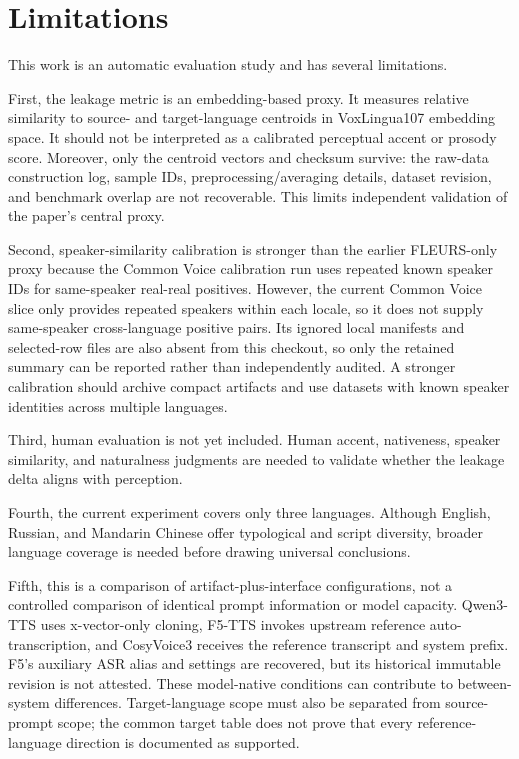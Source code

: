 \documentclass[11pt]{article}
\begin{document}
\FloatBarrier

\section{Limitations}

This work is an automatic evaluation study and has several limitations.

First, the leakage metric is an embedding-based proxy. It measures relative similarity to source- and target-language centroids in VoxLingua107 embedding space. It should not be interpreted as a calibrated perceptual accent or prosody score. Moreover, only the centroid vectors and checksum survive: the raw-data construction log, sample IDs, preprocessing/averaging details, dataset revision, and benchmark overlap are not recoverable. This limits independent validation of the paper's central proxy.

Second, speaker-similarity calibration is stronger than the earlier FLEURS-only proxy because the Common Voice calibration run uses repeated known speaker IDs for same-speaker real-real positives. However, the current Common Voice slice only provides repeated speakers within each locale, so it does not supply same-speaker cross-language positive pairs. Its ignored local manifests and selected-row files are also absent from this checkout, so only the retained summary can be reported rather than independently audited. A stronger calibration should archive compact artifacts and use datasets with known speaker identities across multiple languages.

Third, human evaluation is not yet included. Human accent, nativeness, speaker similarity, and naturalness judgments are needed to validate whether the leakage delta aligns with perception.

Fourth, the current experiment covers only three languages. Although English, Russian, and Mandarin Chinese offer typological and script diversity, broader language coverage is needed before drawing universal conclusions.

Fifth, this is a comparison of artifact-plus-interface configurations, not a controlled comparison of identical prompt information or model capacity. Qwen3-TTS uses x-vector-only cloning, F5-TTS invokes upstream reference auto-transcription, and CosyVoice3 receives the reference transcript and system prefix. F5's auxiliary ASR alias and settings are recovered, but its historical immutable revision is not attested. These model-native conditions can contribute to between-system differences. Target-language scope must also be separated from source-prompt scope; the common target table does not prove that every reference-language direction is documented as supported.
\end{document}
